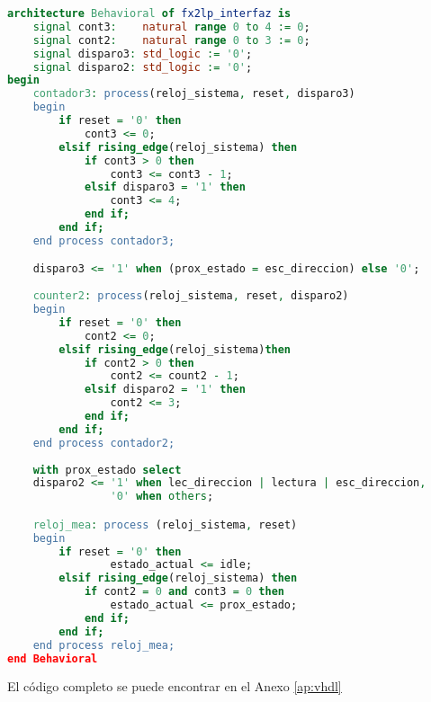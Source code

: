 \begin{lstlisting}[language=VHDL,backgroundcolor=\color{gray!30}]
architecture Behavioral of fx2lp_interfaz is
	signal cont3:	 natural range 0 to 4 := 0;
	signal cont2:	 natural range 0 to 3 := 0;
	signal disparo3: std_logic := '0';
	signal disparo2: std_logic := '0';
begin
	contador3: process(reloj_sistema, reset, disparo3)
	begin
		if reset = '0' then
			cont3 <= 0;
		elsif rising_edge(reloj_sistema) then
			if cont3 > 0 then
				cont3 <= cont3 - 1;
			elsif disparo3 = '1' then
				cont3 <= 4;
			end if;
		end if;
	end process contador3;

	disparo3 <= '1' when (prox_estado = esc_direccion) else '0';
	
	counter2: process(reloj_sistema, reset, disparo2)
	begin
		if reset = '0' then
			cont2 <= 0;
		elsif rising_edge(reloj_sistema)then
			if cont2 > 0 then
				cont2 <= count2 - 1;
			elsif disparo2 = '1' then
				cont2 <= 3;
			end if;
		end if;
	end process contador2;
	
	with prox_estado select
	disparo2 <=	'1' when lec_direccion | lectura | esc_direccion,
				'0' when others;

	reloj_mea: process (reloj_sistema, reset)
	begin
		if reset = '0' then
				estado_actual <= idle;
		elsif rising_edge(reloj_sistema) then
			if cont2 = 0 and cont3 = 0 then
				estado_actual <= prox_estado;
			end if;
		end if;
	end process reloj_mea;
end Behavioral
\end{lstlisting}

El código completo se puede encontrar en el Anexo \ref{ap:vhdl}
